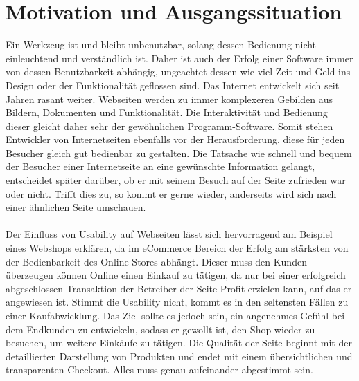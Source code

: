 %
%
%
%

\section{Motivation und Ausgangssituation}

Ein Werkzeug ist und bleibt unbenutzbar, solang dessen Bedienung nicht einleuchtend und verständlich ist. Daher ist auch der Erfolg einer Software immer von dessen Benutzbarkeit abhängig, ungeachtet dessen wie viel Zeit und Geld ins Design oder der Funktionalität geflossen sind. Das Internet entwickelt sich seit Jahren rasant weiter. Webseiten werden zu immer komplexeren Gebilden aus Bildern, Dokumenten und Funktionalität. Die Interaktivität und Bedienung dieser gleicht daher sehr der gewöhnlichen Programm-Software. Somit stehen Entwickler von Internetseiten ebenfalls vor der Herausforderung, diese für jeden Besucher gleich gut bedienbar zu gestalten. Die Tatsache wie schnell und bequem der Besucher einer Internetseite an eine gewünschte Information gelangt, entscheidet später darüber, ob er mit seinem Besuch auf der Seite zufrieden war oder nicht. Trifft dies zu, so kommt er gerne wieder, anderseits wird sich nach einer ähnlichen Seite umschauen.\\
\\
Der Einfluss von Usability auf Webseiten lässt sich hervorragend am Beispiel eines Webshops erklären, da im eCommerce Bereich der Erfolg am stärksten von der Bedienbarkeit des Online-Stores abhängt. Dieser muss den Kunden überzeugen können Online einen Einkauf zu tätigen, da nur bei einer erfolgreich abgeschlossen Transaktion der Betreiber der Seite Profit erzielen kann, auf das er angewiesen ist. Stimmt die Usability nicht, kommt es in den seltensten Fällen zu einer Kaufabwicklung. Das Ziel sollte es jedoch sein, ein angenehmes Gefühl bei dem Endkunden zu entwickeln, sodass er gewollt ist, den Shop wieder zu besuchen, um weitere Einkäufe zu tätigen. Die Qualität der Seite beginnt mit der detaillierten Darstellung von Produkten und endet mit einem übersichtlichen und transparenten Checkout. Alles muss genau aufeinander abgestimmt sein.\\
\\
